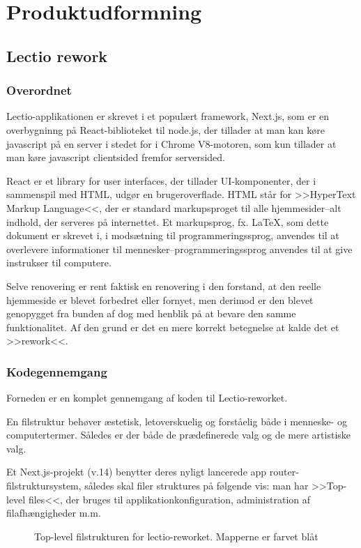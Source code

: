 \section{Produktudformning \label{sec:produktudformning}}
    \subsection{Lectio rework}
        \subsubsection{Overordnet}
           Lectio-applikationen er skrevet i et populært framework, Next.js, som er en overbygninng på React-biblioteket til node.js, der tillader at man kan køre javascript på en server i stedet for i Chrome V8-motoren, som kun tillader at man køre javascript clientsided fremfor serversided.

            React er et library for user interfaces, der tillader UI-komponenter, der i sammenspil med HTML, udgør en brugeroverflade. HTML står for >>HyperText Markup Language<<, der er standard markupsproget til alle hjemmesider--alt indhold, der serveres på internettet. Et markupsprog, fx. \LaTeX, som dette dokument er skrevet i, i modsætning til programmeringssprog, anvendes til at overlevere informationer til mennesker--programmeringssprog anvendes til at give instrukser til computere.

           Selve renovering er rent faktisk en renovering i den forstand, 
           at den reelle hjemmeside er blevet forbedret eller fornyet, 
           men derimod er den blevet genopygget fra bunden af dog med henblik på at bevare den samme funktionalitet. 
           Af den grund er det en mere korrekt betegnelse at kalde det et >>rework<<.
        \subsubsection{Kodegennemgang}
        Forneden er en komplet gennemgang af koden til Lectio-reworket.       

        En filstruktur behøver æstetisk, letoverskuelig og forståelig både i menneske- og computertermer.
        Således er der både de prædefinerede valg og de mere artistiske valg. 

        Et Next.js-projekt (v.14) benytter deres nyligt lancerede app router-filstruktursystem, således skal filer struktures på følgende vis: man har >>Top-level files<<, der bruges til applikationkonfiguration, administration af filafhængigheder m.m.\cite{projstruct}
        \begin{figure}[H]
        \caption{Top-level filstrukturen for lectio-reworket. Mapperne er farvet blåt}
        \label{fig:tlprojstruct}
        \end{figure}

